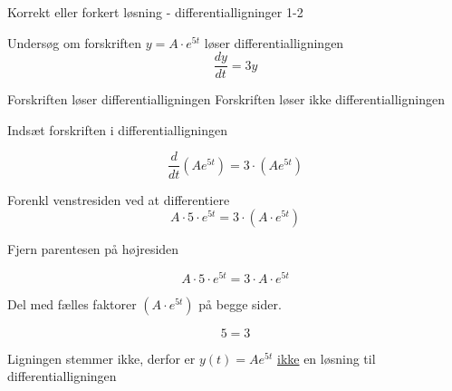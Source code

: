 \documentclass{article}
\begin{document}
\begin{exercise}{Korrekt eller forkert løsning - differentialligninger 1-2}


Undersøg om forskriften $y = A \cdot e^{5t}$ løser differentialligningen
\[
\frac{dy}{dt} = 3y
\]

\begin{multichoice}
\itemfalse Forskriften løser differentialligningen
\itemtrue Forskriften løser ikke differentialligningen
\end{multichoice}

\hint

Indsæt forskriften i differentialligningen

\hint
\[
\frac{d}{dt} \left( A e^{5t}\right) = 3 \cdot \left( A e^{5t} \right)
\]


\hint

Forenkl venstresiden ved at differentiere
\[
A \cdot 5 \cdot e^{5t} = 3 \cdot \left(A \cdot e^{5t} \right)
\]

\hint

Fjern parentesen på højresiden

\hint
\[
A \cdot 5 \cdot e^{5t} = 3 \cdot A \cdot e^{5t}
\]

\hint
Del med fælles faktorer $\left( A \cdot e^{5t} \right)$ på begge sider.

\hint

\[
5 = 3
\]


\hint

Ligningen stemmer ikke, derfor er $y(t) = A e^{5t}$ \underline{ikke} en løsning til differentialligningen

\end{exercise}

\newpage
\end{document}
